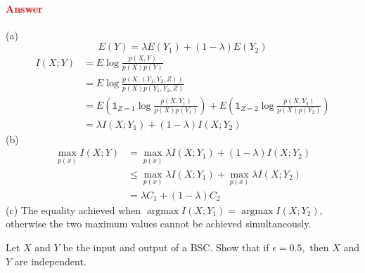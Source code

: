 \documentclass[8pt]{article}
\begin{document}
\paragraph{\textcolor{red}{Answer}}
(a) 
$$
E(Y) = \lambda E(Y_1) + (1-\lambda) E(Y_2)
$$
$$
\begin{aligned}
I(X ; Y) &= E \log \frac{p(X, Y)}{p(X) p(Y)} \\
& = E \log \frac{p(X, (Y_1, Y_2, Z))}{p(X) p(Y_1, Y_2, Z)} \\ 
& = E \left(\mathbb{1}_{Z=1} \log \frac{p(X, Y_1)}{p(X) p(Y_1)} \right) + E \left(\mathbb{1}_{Z=2} \log \frac{p(X, Y_2)}{p(X) p(Y_2)} \right)  \\
& = \lambda I\left(X ; Y_{1}\right)+(1-\lambda) I\left(X ; Y_{2}\right)
\end{aligned}
$$
(b) 
$$
\begin{aligned}
\max _{p(x)} I(X ; Y) &= \max _{p(x)} \lambda I\left(X ; Y_{1}\right)+(1-\lambda) I\left(X ; Y_{2}\right) \\
&\leq \max _{p(x)} \lambda I\left(X ; Y_{1}\right)+ \max _{p(x)} \lambda I\left(X ; Y_{2}\right) \\
&= \lambda C_{1}+(1-\lambda) C_{2}
\end{aligned}
$$
(c) The equality achieved when $\operatorname{argmax} I\left(X ; Y_{1}\right) = \operatorname{argmax} I\left(X ; Y_{2}\right)$, otherwise the two maximum values cannot be achieved simultaneously.

\begin{tcolorbox}
Let $X$ and $Y$ be the input and output of a BSC. Show that if $\epsilon=0.5,$ then $X$ and $Y$ are independent.
\end{tcolorbox}
\end{document}
